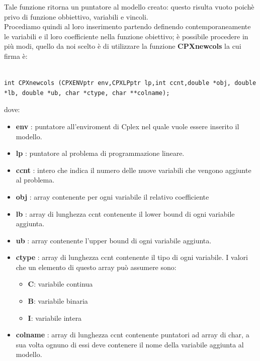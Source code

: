 \documentclass[11pt]{article}
\begin{document}
Tale funzione ritorna un puntatore al modello creato: questo risulta vuoto poich\`e privo di funzione obbiettivo, variabili e vincoli.\\

Procediamo quindi al loro inserimento partendo definendo contemporaneamente le variabili e il loro coefficiente nella funzione obiettivo; è possibile procedere in più modi, quello da noi scelto è di utilizzare la funzione \textbf{CPXnewcols} la cui firma \`e:


\begin{lstlisting}

int CPXnewcols (CPXENVptr env,CPXLPptr lp,int ccnt,double *obj, double *lb, double *ub, char *ctype, char **colname);

\end{lstlisting}

dove:

\begin{itemize}
\item \textbf{env} : puntatore all'enviroment di Cplex nel quale vuole essere inserito il modello.
\item \textbf{lp} : puntatore al problema di programmazione lineare.
\item \textbf{ccnt} : intero che indica il numero delle nuove variabili che vengono aggiunte al problema.
\item \textbf{obj} : array contenente per ogni variabile il relativo coefficiente 
\item \textbf{lb} : array di lunghezza ccnt contenente il lower bound di ogni variabile aggiunta.
\item \textbf{ub} : array contenente l'upper bound di ogni variabile aggiunta.
\item \textbf{ctype} : array di lunghezza ccnt contenente il tipo di ogni variabile. I valori che un elemento di questo array pu\`o assumere sono:
\begin{itemize}
	\item \textbf{C}: variabile continua
	\item \textbf{B}: variabile binaria
	\item \textbf{I}: variabile intera
\end{itemize}
\item \textbf{colname} : array di lunghezza ccnt contenente puntatori ad array di char, a sua volta ognuno di essi deve contenere il nome della variabile aggiunta al modello.
\end{itemize}
\end{document}

